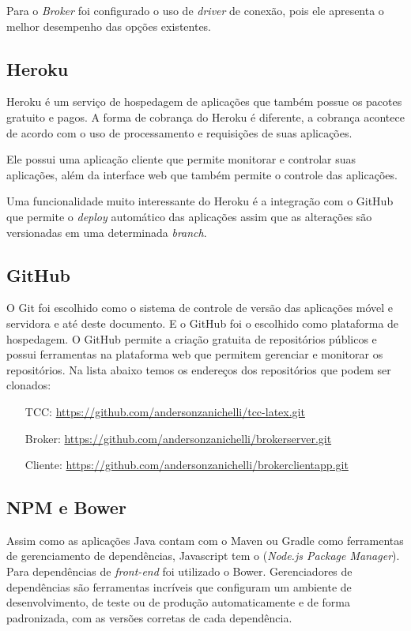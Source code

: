 Para o \textit{Broker} foi configurado o uso de \textit{driver} de conexão, pois ele apresenta o melhor desempenho das opções existentes.

\subsection{Heroku}
Heroku é um serviço de hospedagem de aplicações que também possue os pacotes gratuito e pagos. A forma de cobrança do Heroku é diferente, a cobrança acontece de acordo com o uso de processamento e requisições de suas aplicações.

Ele possui uma aplicação cliente que permite monitorar e controlar suas aplicações, além da interface web que também permite o controle das aplicações.

Uma funcionalidade muito interessante do Heroku é a integração com o GitHub que permite o \textit{deploy} automático das aplicações assim que as alterações são versionadas em uma determinada \textit{branch}.

\subsection{GitHub}
O Git foi escolhido como o sistema de controle de versão das aplicações móvel e servidora e até deste documento. E o GitHub foi o escolhido como plataforma de hospedagem.
O GitHub permite a criação gratuita de repositórios públicos e possui ferramentas na plataforma web que permitem gerenciar e monitorar os repositórios.
Na lista abaixo temos os endereços dos repositórios que podem ser clonados:

\begin{itemize}
  \item[TCC:] \url{https://github.com/andersonzanichelli/tcc-latex.git}
  \item[Broker:] \url{https://github.com/andersonzanichelli/brokerserver.git}
  \item[Cliente:] \url{https://github.com/andersonzanichelli/brokerclientapp.git}
\end{itemize}

\subsection{NPM e Bower}
Assim como as aplicações Java contam com o Maven ou Gradle como ferramentas de gerenciamento de dependências, Javascript tem o  (\textit{Node.js Package Manager}). Para dependências de \textit{front-end} foi utilizado o Bower.
Gerenciadores de dependências são ferramentas incríveis que configuram um ambiente de desenvolvimento, de teste ou de produção automaticamente e de forma padronizada, com as versões corretas de cada dependência.